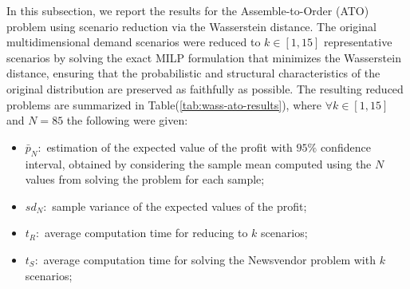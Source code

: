 \documentclass[a4paper,12pt]{article}
\begin{document}
	In this subsection, we report the results for the Assemble-to-Order (ATO) problem using scenario reduction via the Wasserstein distance. The original multidimensional demand scenarios were reduced to $k \in [1,15]$ representative scenarios by solving the exact MILP formulation that minimizes the Wasserstein distance, ensuring that the probabilistic and structural characteristics of the original distribution are preserved as faithfully as possible. The resulting reduced problems are summarized in Table(\ref{tab:wass-ato-results}), where $\forall k \in [1,15]$  and $N = 85 $ the following were given:
	\begin{itemize}
		\item $\bar{p}_{N}:$ estimation of the expected value of the profit with $95\%$ confidence interval, obtained by considering the sample mean computed using the $N$ values from solving the problem for each sample;
		\item $sd_{N}:$ sample variance of the expected values of the profit;
		\item $t_{R}:$ average computation time for reducing to $k$ scenarios;
		\item $t_{S}:$ average computation time for solving the Newsvendor problem with $k$ scenarios;
	\end{itemize}~
	
\end{document}
